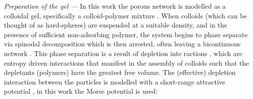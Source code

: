 \textit{Preparation of the gel ---}
In this work the porous network is modelled as a colloidal gel, specifically a colloid-polymer mixture \cite{poon2002}. When colloids (which can be thought of as hard-spheres) are suspended at a suitable density, and in the presence of sufficient non-adsorbing polymer, the system begins to phase separate via spinodal decomposition which is then arrested, often leaving a bicontinuous network \cite{zaccarelli2007,royall2021}.  
This phase separation is a result of depletion inte ractions \cite{lekkerkerker2011}, which are entropy driven interactions that manifest in the assembly of colloids such that the depletants (polymers) have the greatest free volume.
The (effective) depletion interaction between the particles is modelled with a short-range attractive potential \cite{royall2008},  in this work the Morse potential is used:
